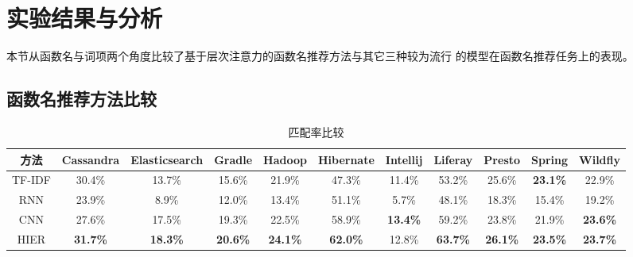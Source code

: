 \section{实验结果与分析}
本节从函数名与词项两个角度比较了基于层次注意力的函数名推荐方法与其它三种较为流行
的模型在函数名推荐任务上的表现。

\subsection{函数名推荐方法比较}


\begin{table}[!t]
\scriptsize
\renewcommand{\arraystretch}{1.3}
\caption{匹配率比较}
\label{accuracy3}
\centering
\begin{tabular}{ccccccccccc}
\toprule
方法 &Cassandra &Elasticsearch &Gradle &Hadoop &Hibernate &Intellij &Liferay &Presto &Spring &Wildfly\\ 
\midrule
TF-IDF&30.4\%&13.7\% &15.6\% &21.9\%&47.3\% &11.4\% &53.2\% &25.6\% &\bf{23.1\%} &22.9\%\\ 
RNN&23.9\% &8.9\% &12.0\%  &13.4\% &51.1\% &5.7\% &48.1\% &18.3\% &15.4\% &19.2\%\\ 
CNN& 27.6\% &17.5\% &19.3\% & 22.5\% &58.9\% &\bf{13.4\%} &59.2\% &23.8\% &21.9\% &\bf{23.6\%}\\ 
HIER&\bf{31.7\%} &\bf{18.3\%} &\bf{20.6\%} &\bf{24.1\%} &\bf{62.0\%} &12.8\% &\bf{63.7\%} &\bf{26.1\%} &\bf{23.5\%} &\bf{23.7\%}\\
\bottomrule
\end{tabular}
\end{table}



